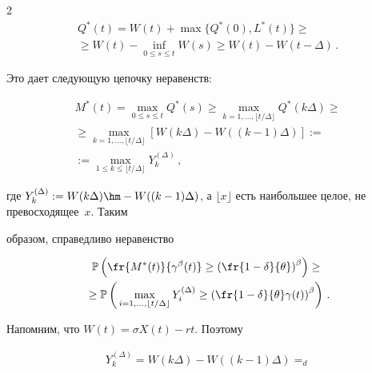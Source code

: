 \begin{multicols}{2}
\begin{multline}
Q^*(t)=W(t)+\max\{Q^*(0), L^*(t)\}\geq{}\\


{}\geq W(t) - \inf_{0 \leq s \leq t} W(s)\geq W(t)-W(t-\Delta)\,.


\label{e18a-ml}


\end{multline}


Это дает  следующую цепочку неравенств:


\begin{multline*}


M^*(t)= \max\limits_{0 \leq s \leq t} Q^*(s)


\geq \max\limits_{k=1,\ldots,\lfloor t/\Delta \rfloor} Q^*(k \Delta)\geq{}\\


{}\geq \max\limits_{k=1,\ldots,\lfloor t/\Delta \rfloor}


[W(k\Delta)-W((k-1)\Delta)]:={}\\


{}:=\max\limits_{1\leq k \leq \lfloor t/\Delta \rfloor}Y_k^{(\Delta)}\,,


\end{multline*}


где $Y_k^{(\Delta)}:=W(k\Delta)\hm-W((k-1)\Delta)$, а $\lfloor x


\rfloor$ есть  наибольшее целое, не превосходящее~$x$. Таким


образом, справедливо неравенство


\begin{multline}


\mathbb{P} \left( \fr{M^*(t)}{\gamma^\beta(t)} \geq\left(


\fr{1-\delta}{\theta}\right)^\beta \right) \geq{}\\


{}\geq \mathbb{P} \left(


\vphantom{\left(\fr{1-\delta}{theta}\right)^\beta}


\max\limits_{i=1,\ldots ,\lfloor t/\Delta \rfloor}Y_i^{(\Delta)} \geq


\left(\fr{1-\delta}{\theta}\gamma (t)\right)^\beta\right)\,.


\label{asymp1-l4}


\end{multline}


Напомним, что  $W(t)=\sigma X(t)-rt$. Поэтому


\begin{multline*}


Y_k^{(\Delta)}= W(k\Delta)-W((k-1)\Delta)=_d{}\\



\end{multline*}
\end{multicols}
